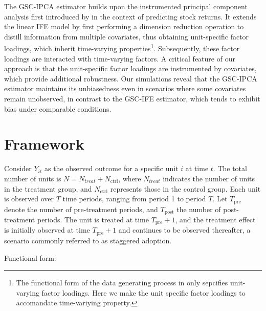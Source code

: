 \documentclass[12pt]{article}
\begin{document}
The GSC-IPCA estimator builds upon the instrumented principal component analysis first introduced by \cite{kelly2020instrumented, kelly2019characteristics} in the context of predicting stock returns. It extends the linear IFE model by first performing a dimension reduction operation to distill information from multiple covariates, thus obtaining unit-specific factor loadings, which inherit time-varying properties\footnote{The functional form of the data generating process in \cite{xu2017generalized} only sepcifies unit-varying factor loadings. Here we make the unit specific factor loadings to accomandate time-variying property.}. Subsequently, these factor loadings are interacted with time-varying factors. A critical feature of our approach is that the unit-specific factor loadings are instrumented by covariates, which provide additional robustness. Our simulations reveal that the GSC-IPCA estimator maintains its unbiasedness even in scenarios where some covariates remain unobserved, in contrast to the GSC-IFE estimator, which tends to exhibit bias under comparable conditions.






 
\section{Framework} 
\label{sec: framework}

Consider $Y_{it}$ as the observed outcome for a specific unit $i$ at time $t$. The total number of units is $N = N_{treat} + N_{\text{ctrl}}$, where $N_{treat}$ indicates the number of units in the treatment group, and $N_{\text{ctrl}}$ represents those in the control group. Each unit is observed over $T$ time periods, ranging from period 1 to period $T$. Let $T_{\text{pre}}$ denote the number of pre-treatment periods, and $T_{\text{post}}$ the number of post-treatment periods. The unit is treated at time $T_{\text{pre}} + 1$, and the treatment effect is initially observed at time $T_{\text{pre}} + 1$ and continues to be observed thereafter, a scenario commonly referred to as staggered adoption.

\begin{assumption}
Functional form:
\label{ass: function}
\end{assumption}
\end{document}
